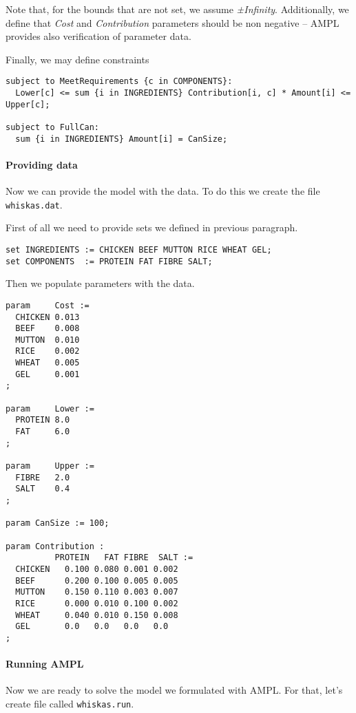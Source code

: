 Note that, for the bounds that are not set, we assume \emph{±Infinity}. Additionally, we define that \emph{Cost} and \emph{Contribution} parameters should be non negative -- AMPL provides also verification of parameter data.


Finally, we may define constraints

\begin{lstlisting}
subject to MeetRequirements {c in COMPONENTS}:
  Lower[c] <= sum {i in INGREDIENTS} Contribution[i, c] * Amount[i] <= Upper[c];
  
subject to FullCan: 
  sum {i in INGREDIENTS} Amount[i] = CanSize;
\end{lstlisting}

\paragraph{Providing data}

Now we can provide the model with the data. To do this we create the file \texttt{whiskas.dat}.

First of all we need to provide sets we defined in previous paragraph.
\begin{lstlisting}
set INGREDIENTS := CHICKEN BEEF MUTTON RICE WHEAT GEL;
set COMPONENTS  := PROTEIN FAT FIBRE SALT;
\end{lstlisting}

Then we populate parameters with the data.
\begin{lstlisting}
param     Cost :=
  CHICKEN 0.013
  BEEF    0.008
  MUTTON  0.010
  RICE    0.002
  WHEAT   0.005
  GEL     0.001
;

param     Lower :=
  PROTEIN 8.0
  FAT     6.0
;

param     Upper :=
  FIBRE   2.0
  SALT    0.4
;

param CanSize := 100;

param Contribution :
          PROTEIN   FAT FIBRE  SALT :=
  CHICKEN   0.100 0.080 0.001 0.002 
  BEEF      0.200 0.100 0.005 0.005 
  MUTTON    0.150 0.110 0.003 0.007 
  RICE      0.000 0.010 0.100 0.002 
  WHEAT     0.040 0.010 0.150 0.008 
  GEL       0.0   0.0   0.0   0.0   
;
\end{lstlisting} 

\paragraph{Running AMPL}

Now we are ready to solve the model we formulated with AMPL. For that, let's create file called \texttt{whiskas.run}.

